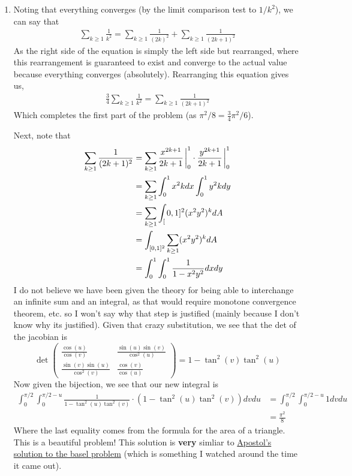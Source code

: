 \documentclass[12pt]{article}
\theoremstyle{definition}
\theoremstyle{remark}
\begin{document}
\begin{enumerate}[leftmargin=\labelsep]
		\item Noting that everything converges (by the limit comparison test to $1/k^2$), we can say that 
		\begin{align*}
			\sum_{k \geq 1} \frac1{k^2} = \sum_{k \geq 1} \frac1{(2k)^2} + \sum_{k \geq 1} \frac{1}{(2k+1)^2}
		\end{align*}
		As the right side of the equation is simply the left side but rearranged, where this rearrangement is guaranteed to exist and converge to the actual value because everything converges (absolutely). Rearranging this equation gives us,
		\begin{align*}
			\frac34 \sum_{k \geq 1} \frac{1}{k^2} = \sum_{k \geq 1} \frac{1}{(2k+1)^2}
		\end{align*}
		Which completes the first part of the problem (as $\pi^2/8 = \frac 34 \pi^2/6$).
		
		Next, note that
		\begin{align*}
			\sum_{k \geq 1} \frac{1}{(2k+1)^2} &= \sum_{k \geq 1} \frac{x^{2k+1}}{2k+1} \eval_0^1 \cdot \frac{y^{2k+1}}{2k+1} \eval_0^1 \\
			&= \sum_{k \geq 1} \int_0^1 x^2k dx \int_0^1 y^2kdy \\
			&= \sum_{k \geq 1} \int_[0,1]^2 (x^2y^2)^k dA \\
			&=  \int_{[0, 1]^2} \sum_{k \geq 1} (x^2y^2)^k dA \\
			&= \int_0^1 \int_0^1 \frac1{1-x^2y^2}dxdy
		\end{align*}
		I do not believe we have been given the theory for being able to interchange an infinite sum and an integral, as that would require monotone convergence theorem, etc. so I won't say why that step is justified (mainly because I don't know why its justified). Given that crazy substitution, we see that the det of the jacobian is
		$$\det\begin{pmatrix}
			\frac{\cos(u)}{\cos(v)} & \frac{\sin(u)\sin(v)}{\cos^2(u)} \\
			\frac{\sin(v)\sin(u)}{\cos^2(v)} & \frac{\cos(v)}{\cos(u)} 
		\end{pmatrix} = 1 - \tan^2(v)\tan^2(u)$$
		Now given the bijection, we see that our new integral is
		\begin{align*}
			\int_0^{\pi/2} \int_0^{\pi/2 - u} \frac{1}{1-\tan^2(u)\tan^2(v)} \cdot (1-\tan^2(u)\tan^2(v))  dvdu &= \int_0^{\pi/2} \int_0^{\pi/2 - u} 1dvdu \\
			&= \frac{\pi^2}{8}
		\end{align*}
		Where the last equality comes from the formula for the area of a triangle. This is a beautiful problem! This solution is \textbf{very} simliar to \href{https://www.youtube.com/watch?v=etqcF3ZvoXA}{Apostol's solution to the basel problem} (which is something I watched around the time it came out).
	\end{enumerate}
\end{document}
